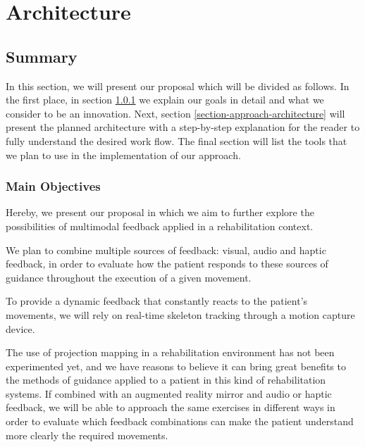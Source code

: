\chapter{Architecture}
\label{sec:Architecture}
\section*{Summary}
 
In this section, we will present our proposal which will be divided as follows. 
In the first place, in section \ref{section-approach-main-objectives} we explain
our goals in detail and what we consider to be an innovation. 
Next, section \ref{section-approach-architecture} will present the planned architecture with a step-by-step 
explanation for the reader to fully understand the desired work flow.
The final section will list the tools that we plan to use in the implementation of our approach.

\subsection{Main Objectives}
\label{section-approach-main-objectives}

Hereby, we present our proposal in which we aim to further explore the possibilities of multimodal 
feedback applied in a rehabilitation context.

We plan to combine multiple sources of feedback: visual, audio and haptic feedback, 
in order to evaluate how the patient responds to these sources of 
guidance throughout the execution of a given movement. 

To provide a dynamic feedback that constantly reacts to the patient's movements, we will rely on real-time skeleton tracking through a motion capture device.

The use of projection mapping in a rehabilitation environment has not been experimented yet, 
and we have reasons to believe it can bring great benefits to the methods of guidance 
applied to a patient in this kind of rehabilitation systems. If combined with an augmented reality mirror 
and audio or haptic feedback, we will be able to approach the same exercises in different ways in order to evaluate which 
feedback combinations can make the patient understand more clearly the required movements.

